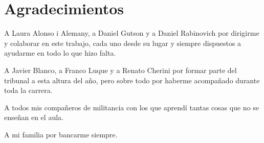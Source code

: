 \chapter*{Agradecimientos}
A Laura Alonso i Alemany, a Daniel Gutson y a Daniel Rabinovich por dirigirme
y colaborar en este trabajo, cada uno desde su lugar y siempre dispuestos a
ayudarme en todo lo que hizo falta. 

A Javier Blanco, a Franco Luque y a Renato Cherini por formar parte del tribunal
a esta altura del a\~no, pero sobre todo por haberme acompa\~nado durante toda
la carrera. 

A todos mis compa\~neros de militancia con los que aprend\'i tantas cosas que no
se ense\~nan en el aula. 

A mi familia por bancarme siempre.